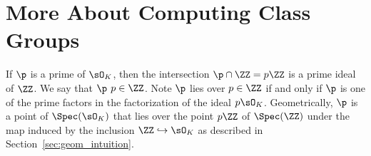 


\section{More About Computing Class Groups}\label{sec:comcg}

If $\p$ is a prime of $\sO_K$, then the intersection $\p \cap \ZZ = p\ZZ$ is
a prime ideal of $\ZZ$.  We say that $\p$  $p\in\ZZ$.
Note $\p$ lies over $p\in\ZZ$ if and only if $\p$ is one of the prime
factors in the factorization of the ideal $p\sO_K$.  Geometrically,
$\p$ is a point of $\Spec(\sO_K)$ that lies over the point $p\ZZ$ of
$\Spec(\ZZ)$ under the map induced by the inclusion $\ZZ \hookrightarrow \sO_K$
as described in Section~\ref{sec:geom_intuition}.


